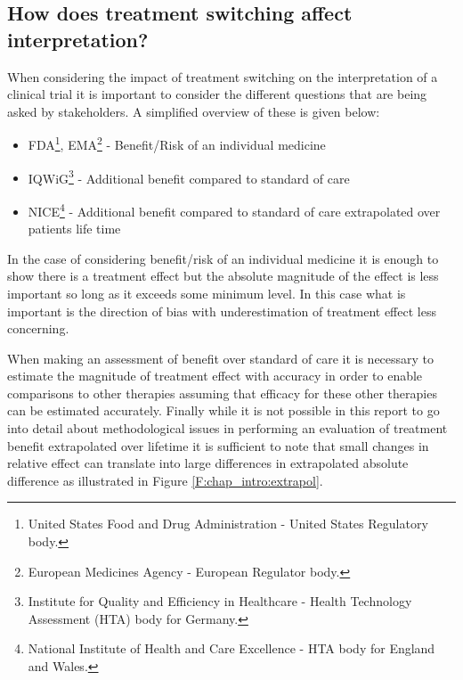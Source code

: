 \subsection{How does treatment switching affect interpretation?}
When considering the impact of treatment switching on the interpretation of a clinical trial it is important to consider the different questions that are being asked by stakeholders. A simplified overview of these is given below:
\begin{itemize}
\item FDA\footnote{United States Food and Drug Administration - United States Regulatory body.}, EMA\footnote{European Medicines Agency - European Regulator body.} - Benefit/Risk of an individual medicine   
\item IQWiG\footnote{Institute for Quality and Efficiency in Healthcare - Health Technology Assessment (HTA) body for Germany. } - Additional benefit compared to standard of care 
\item NICE\footnote{National Institute of Health and Care Excellence - HTA body for England and Wales.} - Additional benefit compared to standard of care extrapolated over patients life time  
\end{itemize}
In the case of considering benefit/risk of an individual medicine it is enough to show there is a treatment effect but the absolute magnitude of the effect is less important so long as it exceeds some minimum level. In this case what is important is the direction of bias with underestimation of treatment effect less concerning.

When making an assessment of benefit over standard of care it is necessary to estimate the magnitude of treatment effect with accuracy in order to enable comparisons to other therapies assuming that efficacy for these other therapies can be estimated accurately. Finally while it is not possible in this report to go into detail about methodological issues in performing an evaluation of treatment benefit extrapolated over lifetime it is sufficient to note that small changes in relative effect can translate into large differences in extrapolated absolute difference as illustrated in Figure \ref{F:chap_intro:extrapol}.

